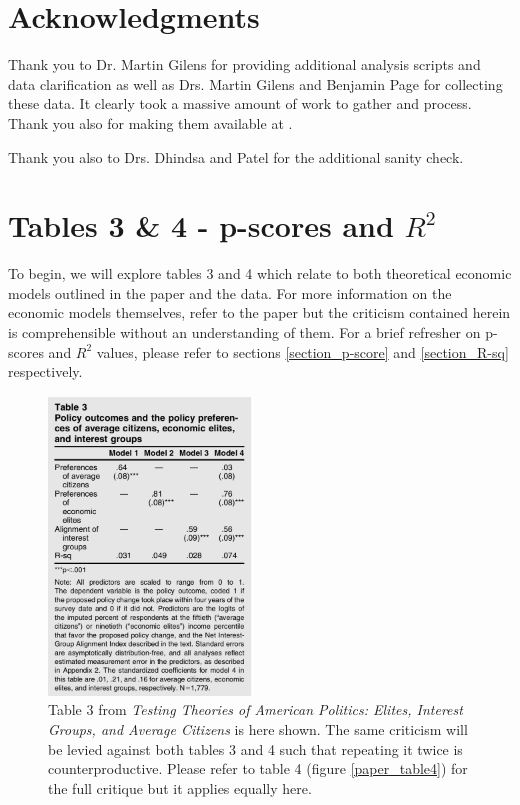 \documentclass[]{article}
\begin{document}
\section{Acknowledgments}
Thank you to Dr. Martin Gilens for providing additional analysis scripts and data clarification as well as Drs. Martin Gilens and Benjamin Page for collecting these data. 
It clearly took a massive amount of work to gather and process.
Thank you also for making them available at \cite{gilens}.

Thank you also to Drs. Dhindsa and Patel for the additional sanity check.

\newpage
\section{Tables 3 \& 4 - p-scores and $R^2$}
To begin, we will explore tables 3 and 4 which relate to both theoretical economic models outlined in the paper and the data.
For more information on the economic models themselves, refer to the paper but the criticism contained herein is comprehensible without an understanding of them.
For a brief refresher on p-scores and $R^2$ values, please refer to sections \ref{section_p-score} and \ref{section_R-sq} respectively.

\begin{figure}[H]
	\begin{center}
		\includegraphics[height=300px]{./figures/paper/economic-table3.png}
	\end{center}	
	\caption{Table 3 from \textit{Testing Theories of American Politics: Elites, Interest Groups, and Average Citizens} is here shown. The same criticism will be levied against both tables 3 and 4 such that repeating it twice is counterproductive. Please refer to table 4 (figure \ref{paper_table4}) for the full critique but it applies equally here.}
	\label{paper_table3}
\end{figure}
\end{document}
